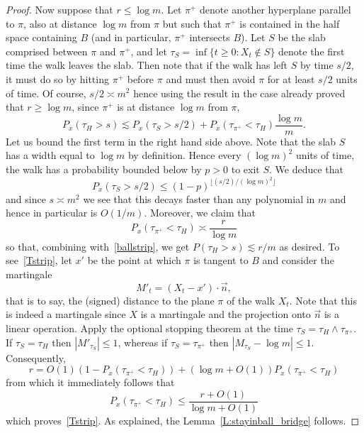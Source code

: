 \documentclass[AHL, Unicode, longabstracts, published]{cedram}
\newcommand{\Pmh}{P}
\begin{document}
\begin{proof}
Now suppose that $r \le \log m$. Let $\pi^+$ denote another hyperplane parallel to $\pi$, also at distance $\log m$ from $\pi$ but such that $\pi^+$ is contained in the half space containing $B$ (and in particular, $\pi^+$ intersects $B$). Let $S$ be the slab comprised between $\pi $ and $\pi^+$, and let $\tau_S = \inf \{ t \ge 0: X_t \notin S\}$ denote the first time the walk leaves the slab. Then note that if the walk has left $S$ by time $s/2$, it must do so by hitting $\pi^+$ before $\pi$ and must then avoid $\pi$ for at least $s/2$ units of time. Of course, $s/2 \asymp m^2$ hence using the result in the case already proved that $r \ge \log m$, since $\pi^+$ is at distance $\log m$ from $\pi$,
\begin{equation}\label{ballstrip}
\Pmh_x(\tau_H >s) \lesssim \Pmh_x(\tau_S > s/2) + \Pmh_x(\tau_{\pi^+} < \tau_H) \frac{\log m}{m}.
\end{equation}
Let us bound the first term in the right hand side above. Note that the slab $S$ has a width equal to $\log m$ by definition. Hence every $(\log m)^2$ units of time, the walk has a probability bounded below by $p>0$ to exit $S$. We deduce that
\[
\Pmh_x(\tau_S > s/2) \le (1-p)^{\lfloor (s/2)/(\log m)^2\rfloor }
\]
and since $s \asymp m^2$ we see that this decays faster than any polynomial in $m$ and hence in particular is $O(1/m)$. Moreover, we claim that
\begin{equation}\label{Tstrip}
\Pmh_x(\tau_{\pi^+} < \tau_H) \asymp \frac{r}{\log m}
\end{equation}
so that, combining with~\eqref{ballstrip}, we get $\Pmh(\tau_H >s) \lesssim r/m$ as desired. To see~\eqref{Tstrip}, let $x'$ be the point at which $\pi$ is tangent to $B$ and consider the martingale
\[
M'_t = (X_t - x') \cdot \vec{n},
\]
that is to say, the (signed) distance to the plane $\pi$ of the walk $X_t$. Note that this is indeed a martingale since $X$ is a martingale and the projection onto $\vec{n}$ is a linear operation. Apply the optional stopping theorem at the time $\tau_S = \tau_H \wedge \tau_{\pi^+}$. If $\tau_S = \tau_H$ then $|M'_{\tau_S} | \le 1 $, whereas if $\tau_S = \tau_{\pi^+}$ then $|M_{\tau_S}- \log m |\le 1$. Consequently,
\[
r = O(1) (1- \Pmh_x (\tau_{\pi^+} < \tau_H)) + (\log m + O(1)) \Pmh_x(\tau_{\pi^+} < \tau_H)
\]
from which it immediately follows that
\[
\Pmh_x(\tau_{\pi^+} < \tau_H) \le \frac{r + O(1)}{\log m + O(1)}
\]
which proves~\eqref{Tstrip}. As explained, the Lemma~\ref{L:stayinball_bridge} follows.
\end{proof}
\end{document}
